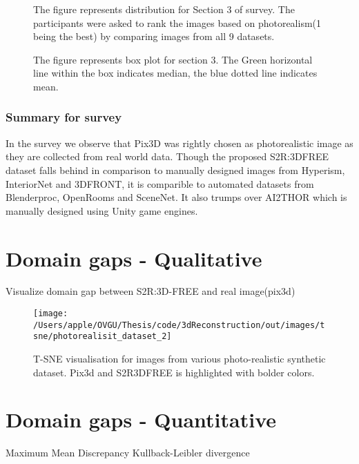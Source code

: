 \begin{figure}
    \centering
    \resizebox{\textwidth}{!}{}
    \caption{The figure represents distribution for Section 3 of survey. The participants were asked to rank the images based on photorealism(1 being the best) by comparing images from all 9 datasets.}
    \label{fig:question3}
\end{figure}

\begin{figure}
    \centering
    \resizebox{\textwidth}{!}{}
    \caption{The figure represents box plot for section 3. The Green horizontal line within the box indicates median, the blue dotted line indicates mean.}
    \label{fig:question3_2}
\end{figure}

\subsubsection{Summary for survey}
In the survey we observe that Pix3D was rightly chosen as photorealistic image as they are collected from real world data.
Though the proposed S2R:3DFREE dataset falls behind in comparison to manually designed images from Hyperism, InteriorNet and 3DFRONT,
it is comparible to automated datasets from Blenderproc, OpenRooms and SceneNet.
It also trumps over AI2THOR which is manually designed using Unity game engines.

\section{Domain gaps - Qualitative}
Visualize domain gap between S2R:3D-FREE and real image(pix3d)


\begin{figure}
    \centering
    \texttt{[image: /Users/apple/OVGU/Thesis/code/3dReconstruction/out/images/tsne/photorealisit\_dataset\_2]}
    \caption{T-SNE visualisation for images from various photo-realistic synthetic dataset. Pix3d and S2R3DFREE is highlighted with bolder colors.}
    \label{fig:photorealistic tsne}
\end{figure}

\section{Domain gaps - Quantitative}
Maximum Mean Discrepancy
Kullback-Leibler divergence

